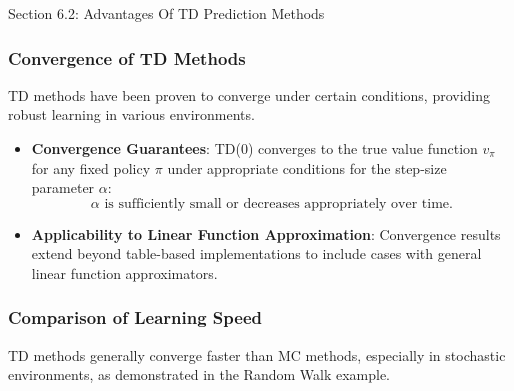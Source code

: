 \begin{notes}{Section 6.2: Advantages Of TD Prediction Methods}
\begin{highlight}
    \end{highlight}
    
    \subsubsection*{Convergence of TD Methods}
    
    TD methods have been proven to converge under certain conditions, providing robust learning in various environments.
    
    \begin{highlight}
    
        \begin{itemize}
            \item \textbf{Convergence Guarantees}: TD(0) converges to the true value function $v_\pi$ for any fixed policy $\pi$ under appropriate conditions for the step-size parameter $\alpha$:
            \[
            \alpha \text{ is sufficiently small or decreases appropriately over time.}
            \]
            \item \textbf{Applicability to Linear Function Approximation}: Convergence results extend beyond table-based implementations to include cases with general linear function approximators.
        \end{itemize}
    
    \end{highlight}
    
    \subsubsection*{Comparison of Learning Speed}
    
    TD methods generally converge faster than MC methods, especially in stochastic environments, as demonstrated in the Random Walk example.
    
    \begin{highlight}
    

\end{highlight}
\end{notes}
